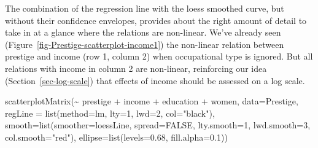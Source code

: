 \documentclass[
  letterpaper,
  10pt,
  krantz2]{krantz}
\makeatletter
\newenvironment{Shaded}{\begin{snugshade}}{\end{snugshade}}
\newcommand{\AttributeTok}[1]{\textcolor[rgb]{0.40,0.45,0.13}{#1}}
\newcommand{\ConstantTok}[1]{\textcolor[rgb]{0.56,0.35,0.01}{#1}}
\newcommand{\DecValTok}[1]{\textcolor[rgb]{0.68,0.00,0.00}{#1}}
\newcommand{\FloatTok}[1]{\textcolor[rgb]{0.68,0.00,0.00}{#1}}
\newcommand{\FunctionTok}[1]{\textcolor[rgb]{0.28,0.35,0.67}{#1}}
\newcommand{\NormalTok}[1]{\textcolor[rgb]{0.00,0.23,0.31}{#1}}
\newcommand{\SpecialCharTok}[1]{\textcolor[rgb]{0.37,0.37,0.37}{#1}}
\newcommand{\StringTok}[1]{\textcolor[rgb]{0.13,0.47,0.30}{#1}}
\newenvironment{kframe}{%
  \medskip{}
  \setlength{\fboxsep}{.8em}
  \def\at@end@of@kframe{}%
  \ifinner\ifhmode%
  \def\at@end@of@kframe{\end{minipage}}%
  \begin{minipage}{\columnwidth}%
  \fi\fi%
  \def\FrameCommand##1{\hskip\@totalleftmargin \hskip-\fboxsep
  \colorbox{shadecolor}{##1}\hskip-\fboxsep
      \hskip-\linewidth \hskip-\@totalleftmargin \hskip\columnwidth}%
  \MakeFramed {\advance\hsize-\width
    \@totalleftmargin\z@ \linewidth\hsize
    \@setminipage}}%
{\par\unskip\endMakeFramed%
  \at@end@of@kframe}
\renewenvironment{Shaded}{\begin{kframe}}{\end{kframe}}
\makeatother
\begin{document}
The combination of the regression line with the loess smoothed curve,
but without their confidence envelopes, provides about the right amount
of detail to take in at a glance where the relations are non-linear.
We've already seen (Figure~\ref{fig-Prestige-scatterplot-income1}) the
non-linear relation between prestige and income (row 1, column 2) when
occupational type is ignored. But all relations with income in column 2
are non-linear, reinforcing our idea (Section~\ref{sec-log-scale}) that
effects of income should be assessed on a log scale.

\begin{Shaded}
\begin{Highlighting}[]
\FunctionTok{scatterplotMatrix}\NormalTok{(}\SpecialCharTok{\textasciitilde{}}\NormalTok{ prestige }\SpecialCharTok{+}\NormalTok{ income }\SpecialCharTok{+}\NormalTok{ education }\SpecialCharTok{+}\NormalTok{ women,}
  \AttributeTok{data=}\NormalTok{Prestige,}
  \AttributeTok{regLine =} \FunctionTok{list}\NormalTok{(}\AttributeTok{method=}\NormalTok{lm, }\AttributeTok{lty=}\DecValTok{1}\NormalTok{, }\AttributeTok{lwd=}\DecValTok{2}\NormalTok{, }\AttributeTok{col=}\StringTok{"black"}\NormalTok{),}
  \AttributeTok{smooth=}\FunctionTok{list}\NormalTok{(}\AttributeTok{smoother=}\NormalTok{loessLine, }\AttributeTok{spread=}\ConstantTok{FALSE}\NormalTok{,}
              \AttributeTok{lty.smooth=}\DecValTok{1}\NormalTok{, }\AttributeTok{lwd.smooth=}\DecValTok{3}\NormalTok{, }\AttributeTok{col.smooth=}\StringTok{"red"}\NormalTok{),}
  \AttributeTok{ellipse=}\FunctionTok{list}\NormalTok{(}\AttributeTok{levels=}\FloatTok{0.68}\NormalTok{, }\AttributeTok{fill.alpha=}\FloatTok{0.1}\NormalTok{))}
\end{Highlighting}
\end{Shaded}
\end{document}
